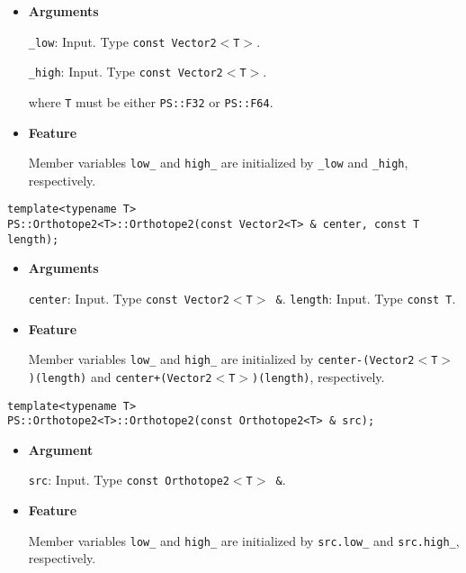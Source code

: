 \begin{itemize}

\item{{\bf Arguments}}

\texttt{\_low}: Input. Type \texttt{const Vector2$<$T$>$}.

\texttt{\_high}: Input. Type \texttt{const Vector2$<$T$>$}.

where \texttt{T} must be either \texttt{PS::F32} or \texttt{PS::F64}.

\item{{\bf Feature}}

Member variables \texttt{low\_} and \texttt{high\_} are initialized by \texttt{\_low} and \texttt{\_high}, respectively.

\end{itemize}
\begin{screen}
\begin{verbatim}
template<typename T>
PS::Orthotope2<T>::Orthotope2(const Vector2<T> & center, const T length);
\end{verbatim}
\end{screen}

\begin{itemize}

\item{{\bf Arguments}}

\texttt{center}: Input. Type \texttt{const Vector2$<$T$>$ \&}.
\texttt{length}: Input. Type \texttt{const T}.

\item{{\bf Feature}}

Member variables \texttt{low\_} and \texttt{high\_} are initialized by \texttt{center-(Vector2$<$T$>$)(length)} and \texttt{center+(Vector2$<$T$>$)(length)}, respectively.

\end{itemize}


\begin{screen}
\begin{verbatim}
template<typename T>
PS::Orthotope2<T>::Orthotope2(const Orthotope2<T> & src);
\end{verbatim}
\end{screen}

\begin{itemize}

\item{{\bf Argument}}

\texttt{src}: Input. Type \texttt{const Orthotope2$<$T$>$ \&}.

\item{{\bf Feature}}

Member variables \texttt{low\_} and \texttt{high\_} are initialized by \texttt{src.low\_} and \texttt{src.high\_}, respectively.

\end{itemize}


